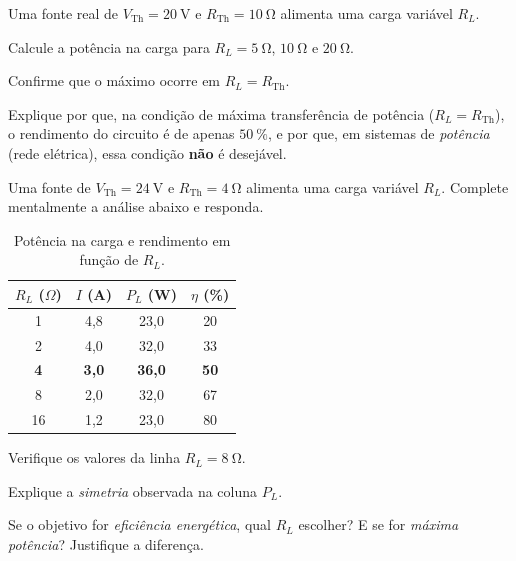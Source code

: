 \blocoaprofundamento
\begin{questao}[3]{}

Uma fonte real de $V_{\text{Th}} = \SI{20}{\volt}$ e $R_{\text{Th}} = \SI{10}{\ohm}$
alimenta uma carga variável $R_L$.
\begin{itensq}
\item Calcule a potência na carga para $R_L = \SI{5}{\ohm}$, $\SI{10}{\ohm}$ e
      $\SI{20}{\ohm}$.
\item Confirme que o máximo ocorre em $R_L = R_{\text{Th}}$.
\end{itensq}


\end{questao}
\begin{questao}[3]{}

Explique por que, na condição de máxima transferência de potência
($R_L = R_{\text{Th}}$), o rendimento do circuito é de apenas
$\SI{50}{\percent}$, e por que, em sistemas de \emph{potência} (rede elétrica),
essa condição \textbf{não} é desejável.


\end{questao}
\begin{questao}[3]{}

Uma fonte de $V_{\text{Th}}=\SI{24}{\volt}$ e $R_{\text{Th}}=\SI{4}{\ohm}$
alimenta uma carga variável $R_L$. Complete mentalmente a análise abaixo e
responda.

\begin{table}[H]
\centering\small\sffamily
\setlength{\arraystretch}{1.25}
\begin{tabular}{@{}c c c c@{}}
\toprule
$R_L$ ($\Omega$) & $I$ (A) & $P_L$ (W) & $\eta$ (\%)\\
\midrule
1  & 4,8 & 23,0 & 20\\
2  & 4,0 & 32,0 & 33\\
\textbf{4}  & \textbf{3,0} & \textbf{36,0} & \textbf{50}\\
8  & 2,0 & 32,0 & 67\\
16 & 1,2 & 23,0 & 80\\
\bottomrule
\end{tabular}
\caption{Potência na carga e rendimento em função de $R_L$.}
\end{table}

\begin{itensq}
\item Verifique os valores da linha $R_L=\SI{8}{\ohm}$.
\item Explique a \emph{simetria} observada na coluna $P_L$.
\item Se o objetivo for \emph{eficiência energética}, qual $R_L$ escolher? E se
      for \emph{máxima potência}? Justifique a diferença.
\end{itensq}


\end{questao}

